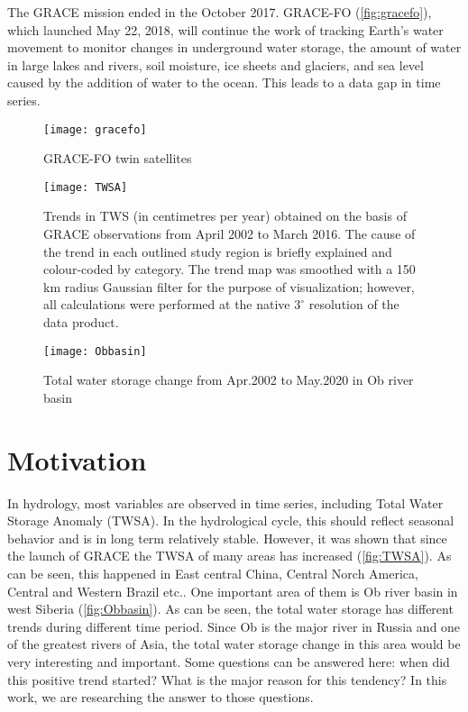 The GRACE mission ended in the October 2017. GRACE-FO (\autoref{fig:gracefo}), which launched May 22, 2018, will continue the work of tracking Earth's water movement to monitor changes in underground water storage, the amount of water in large lakes and rivers, soil moisture, ice sheets and glaciers, and sea level caused by the addition of water to the ocean. This leads to a data gap in time series.
\begin{figure}[htbp]
	\centering
	\texttt{[image: gracefo]} %
	\caption{GRACE-FO twin satellites} 
	\label{fig:gracefo}
\end{figure}
\begin{figure}[htbp]
	\centering
	\texttt{[image: TWSA]} %
	\caption{Trends in TWS (in centimetres per year) obtained on the basis of GRACE observations from April 2002 to March 2016. The cause of the trend in each outlined study region is briefly explained and colour-coded by category. The trend map was smoothed with a 150 km radius Gaussian filter for the purpose of visualization; however, all calculations were performed at the native $3^{\circ}$ resolution of the data product. \cite{rodell2018emerging}} 
	\label{fig:TWSA}
\end{figure}
\begin{figure}[htbp]
	\centering
	\texttt{[image: Obbasin]} %
	\caption{Total water storage change from Apr.2002 to May.2020 in Ob river basin} 
	\label{fig:Obbasin}
\end{figure}
\section{Motivation}
In hydrology, most variables are observed in time series, including Total Water Storage Anomaly (TWSA). In the hydrological cycle, this should reflect seasonal behavior and is in long term relatively stable. However, it was shown that since the launch of GRACE the TWSA of many areas has increased (\autoref{fig:TWSA}). As can be seen, this happened in East central China, Central Norch America, Central and Western Brazil etc.\cite{rodell2018emerging}.  One important area of them is Ob river basin in west Siberia (\autoref{fig:Obbasin}). As can be seen, the total water storage has different trends during different time period. Since Ob is the major river in Russia and one of the greatest rivers of Asia, the total water storage change in this area would be very interesting and important. Some questions can be answered here: when did this positive trend started? What is the major reason for this tendency? In this work, we are researching the answer to those questions. 
